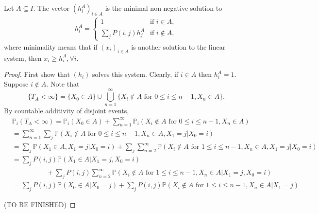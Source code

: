 \documentclass[a4paper]{article}
\begin{document}
\begin{theorem}
	Let $A \subseteq I$. The vector $(h_i^A)_{i \in A}$ is the minimal non-negative solution to
	\begin{align*}
		h_i^A = \begin{cases}
			1 &\mbox{if } i  \in A, \\
			\sum_{j} P(i, j) h_j^A &\mbox{if } i \not \in A,
		   \end{cases}
	\end{align*}
	where minimality means that if $(x_i)_{i \in A}$ is another solution to the linear system, then $x_i \ge h_i^A, \forall i$.
\end{theorem}
\begin{proof}
	First show that $(h_i)$ solves this system. Clearly, if $i\in A$ then $ h_i^A=1 $. Suppose $i\notin A$. Note that 
    \[
        \{T_A<\infty\} = \{X_0\in A\} \cup \bigcup_{n=1}^{\infty}\{X_i\notin A \text{ for }0\le i\le n-1, X_n\in A\}.
    \]
    By countable additivity of disjoint events,
    \begin{align*}
        &\mathbb{P}_i(T_A< \infty) = \mathbb{P}_i(X_0\in A) + \sum_{n=1}^{\infty}\mathbb{P}_i(X_i\notin A \text{ for }0\le i\le n-1, X_n\in A)\\ 
            &= \sum_{n=1}^{\infty} \sum_{j} \mathbb{P}(X_i\notin A \text{ for }0\le i\le n-1, X_n\in A,X_1=j|X_0=i)\\ 
            &=\sum_j \mathbb{P}(X_1\in A,X_1=j|X_0=i)+\sum_j \sum_{n=2}^{\infty}\mathbb{P}(X_i\notin A \text{ for }1\le i\le n-1, X_n\in A,X_1=j|X_0=i)\\ 
            &= \sum_j P(i,j)\mathbb{P}(X_1\in A|X_1=j,X_0=i)\\[-13pt]
            &\hspace{5em}+\sum_{j}P(i,j)\sum_{n=2}^{\infty}\mathbb{P}(X_i\notin A \text{ for }1\le i\le n-1, X_n\in A|X_1=j,X_0=i)\\ 
            &= \sum_j P(i,j) \mathbb{P}(X_0\in A|X_0=j)+ \sum_{j}P(i,j) \mathbb{P}(X_i\notin A \text{ for }1 \le i\le n-1, X_n\in A|X_1=j)
    \end{align*}
    \centerline{(TO BE FINISHED)}
\end{proof}
\end{document}
